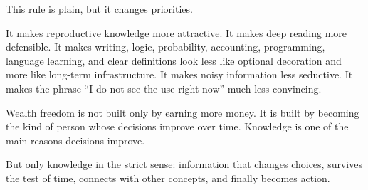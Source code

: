 This rule is plain, but it changes priorities.

It makes reproductive knowledge more attractive. It makes deep reading more defensible. It makes writing, logic, probability, accounting, programming, language learning, and clear definitions look less like optional decoration and more like long-term infrastructure. It makes noisy information less seductive. It makes the phrase ``I do not see the use right now'' much less convincing.

Wealth freedom is not built only by earning more money. It is built by becoming the kind of person whose decisions improve over time. Knowledge is one of the main reasons decisions improve.

But only knowledge in the strict sense: information that changes choices, survives the test of time, connects with other concepts, and finally becomes action.
